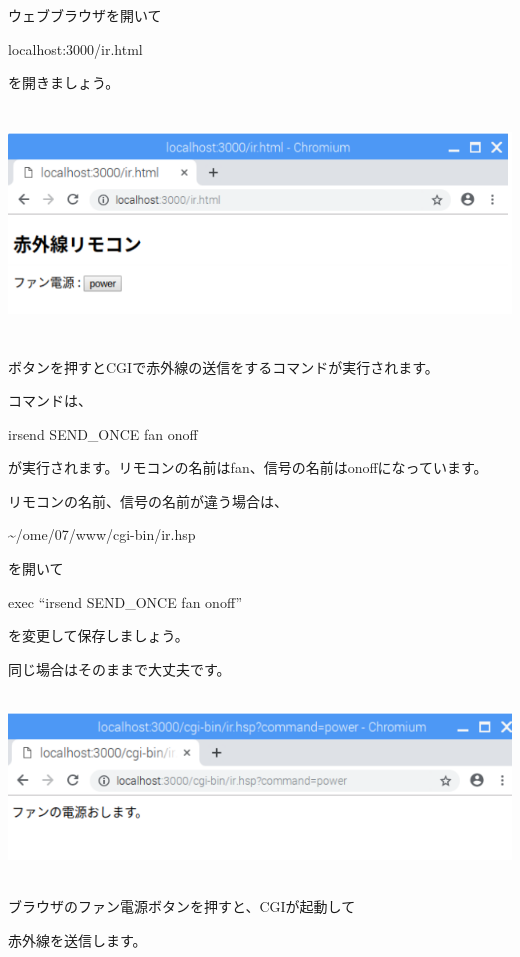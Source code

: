 \documentclass[a4paper,12pt,dvipdfmx]{jarticle}
\begin{document}
ウェブブラウザを開いて

localhost:3000/ir.html

を開きましょう。

%
%


\centering
\includegraphics[width=17.006cm,height=6.142cm]{ome7-img061.png}
\flushleft

ボタンを押すとCGIで赤外線の送信をするコマンドが実行されます。

コマンドは、

irsend SEND\_ONCE fan onoff

が実行されます。リモコンの名前はfan、信号の名前はonoffになっています。

リモコンの名前、信号の名前が違う場合は、

\~{}/ome/07/www/cgi-bin/ir.hsp

を開いて

exec “irsend SEND\_ONCE fan onoff”

を変更して保存しましょう。

同じ場合はそのままで大丈夫です。

%


\centering
\includegraphics[width=16.671cm,height=4.895cm]{ome7-img062.png}
\flushleft

ブラウザのファン電源ボタンを押すと、CGIが起動して

赤外線を送信します。
\end{document}
